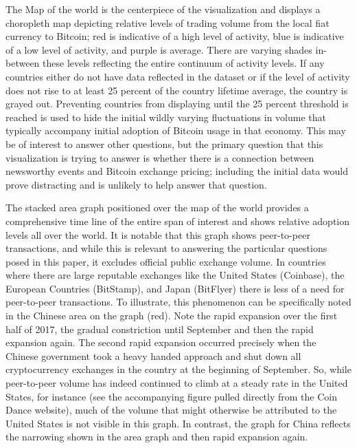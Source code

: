 \documentclass[journal]{vgtc}                %
\begin{document}
The Map of the world is the centerpiece of the visualization and displays a choropleth map depicting relative levels of trading volume from the local fiat currency to Bitcoin; red is indicative of a high level of activity, blue is indicative of a low level of activity, and purple is average.  There are varying shades in-between these levels reflecting the entire continuum of activity levels.  If any countries either do not have data reflected in the dataset or if the level of activity does not rise to at least 25 percent of the country lifetime average, the country is grayed out.  Preventing countries from displaying until the 25 percent threshold is reached is used to hide the initial wildly varying fluctuations in volume that typically accompany initial adoption of Bitcoin usage in that economy.  This may be of interest to answer other questions, but the primary question that this visualization is trying to answer is whether there is a connection between newsworthy events and Bitcoin exchange pricing; including the initial data would prove distracting and is unlikely to help answer that question.

The stacked area graph positioned over the map of the world provides a comprehensive time line of the entire span of interest and shows relative adoption levels all over the world.  It is notable that this graph shows peer-to-peer transactions, and while this is relevant to answering the particular questions posed in this paper, it excludes official public exchange volume.  In countries where there are large reputable exchanges like the United States (Coinbase), the European Countries (BitStamp), and Japan (BitFlyer) there is less of a need for peer-to-peer transactions.  To illustrate, this phenomenon can be specifically noted in the Chinese area on the graph (red).  Note the rapid expansion over the first half of 2017, the gradual constriction until September and then the rapid expansion again.  The second rapid expansion occurred precisely when the Chinese government took a heavy handed approach and shut down all cryptocurrency exchanges in the country at the beginning of September\cite{cdengpvigna-1}. So, while peer-to-peer volume has indeed continued to climb at a steady rate in the United States, for instance (see the accompanying figure pulled directly from the Coin Dance website), much of the volume that might otherwise be attributed to the United States is not visible in this graph.  In contrast, the graph for China reflects the narrowing shown in the area graph and then rapid expansion again.
\end{document}
